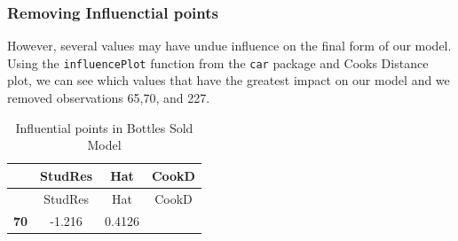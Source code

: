 \documentclass[]{elsarticle} %
\begin{document}
\subsubsection{Removing Influenctial
points}\label{removing-influenctial-points}

However, several values may have undue influence on the final form of
our model. Using the \texttt{influencePlot} function from the
\texttt{car} package and Cooks Distance plot, we can see which values
that have the greatest impact on our model and we removed observations
65,70, and 227.

\begin{longtable}[]{@{}cccc@{}}
\caption{Influential points in Bottles Sold Model}\tabularnewline
\toprule
\begin{minipage}[b]{0.12\columnwidth}\centering\strut
~\strut
\end{minipage} & \begin{minipage}[b]{0.12\columnwidth}\centering\strut
StudRes\strut
\end{minipage} & \begin{minipage}[b]{0.10\columnwidth}\centering\strut
Hat\strut
\end{minipage} & \begin{minipage}[b]{0.10\columnwidth}\centering\strut
CookD\strut
\end{minipage}\tabularnewline
\midrule
\endfirsthead
\toprule
\begin{minipage}[b]{0.12\columnwidth}\centering\strut
~\strut
\end{minipage} & \begin{minipage}[b]{0.12\columnwidth}\centering\strut
StudRes\strut
\end{minipage} & \begin{minipage}[b]{0.10\columnwidth}\centering\strut
Hat\strut
\end{minipage} & \begin{minipage}[b]{0.10\columnwidth}\centering\strut
CookD\strut
\end{minipage}\tabularnewline
\midrule
\endhead
\begin{minipage}[t]{0.12\columnwidth}\centering\strut
\textbf{70}\strut
\end{minipage} & \begin{minipage}[t]{0.12\columnwidth}\centering\strut
-1.216\strut
\end{minipage} & \begin{minipage}[t]{0.10\columnwidth}\centering\strut
0.4126\strut
\end{minipage} & \begin{minipage}[t]{0.10\columnwidth}\centering\strut

\end{minipage}
\end{longtable}
\end{document}
